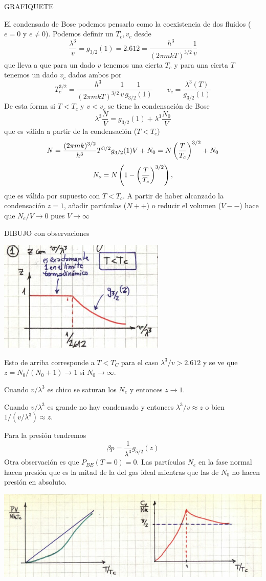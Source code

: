 \documentclass[10pt,oneside]{CBFT_book}
\begin{document}
GRAFIQUETE


El condensado de Bose podemos pensarlo como la coexistencia de dos fluidos ($e=0$ y $e\neq 0$).
Podemos definir un $ T_c, v_c $ desde 
\[
	\frac{\lambda^3}{v} = g_{3/2}(1) = 2.612 = \frac{h^3}{(2 \pi m k T)^{3/2}} \frac{1}{v}
\]
que lleva a que para un dado $v$ tenemos una cierta $T_c$ y para una cierta $T$ tenemos un 
dado $v_c$ dados ambos por 
\[
	T_c^{3/2} = \frac{h^3}{(2 \pi m k T)^{3/2}} \frac{1}{v} \frac{1}{g_{3/2}(1)} \qquad 
	v_c = \frac{\lambda^3(T)}{g_{3/2}(1)}
\]
De esta forma si $ T<T_c$ y $v<v_c$ se tiene la condensación de Bose
\[
	\lambda^3\frac{N}{V} = g_{3/2}(1) + \lambda^3\frac{N_0}{V}
\]
que es válida a partir de la condensación ($T<T_c$)
\[
	N =  \frac{(2 \pi m k )^{3/2}}{h^3} T^{3/2} g_{3/2}(1)  V + N_0 = N \left( \frac{ T }{ T_c } \right)^{3/2} + N_0
\]
\[
	N_o = N \left( 1 - \left( \frac{ T }{ T_c } \right)^{3/2} \right),
\]
que es válida por supuesto con $T<T_c$.
A partir de haber alcanzado la condensación $z=1$, añadir partículas ($N++$) o reducir el volumen 
($V--$) hace que $N_e/V \to 0 $ pues $V \to \infty$

DIBUJO con observaciones

\includegraphics[scale=0.5]{images/1606329632.jpg}

Esto de arriba corresponde a $T < T_C $ para el caso $\lambda^3/v > 2.612 $ y se ve que 
$z = N_0/(N_0+1) \to 1$ si $N_0\to\infty$.

Cuando $v/\lambda^3$ es chico se saturan los $N_e$ y entonces $ z \to 1 $.

Cuando $v/\lambda^3$ es grande no hay condensado y entonces $ \lambda^3/v \approx z $ o bien
$ 1/ (v/\lambda^3) \approx z $.

Para la presión tendremos
\[
	\beta p = \frac{1}{\lambda^3} g_{5/2}(z)
\]
Otra observación es que $P_{BE}(T=0)=0$. Las partículas $N_e$ en la fase normal hacen presión que es la
mitad de la del gas ideal mientras que las de $N_0$ no hacen presión en absoluto.

\includegraphics[scale=0.4]{images/1606329638.jpg}
\end{document}
